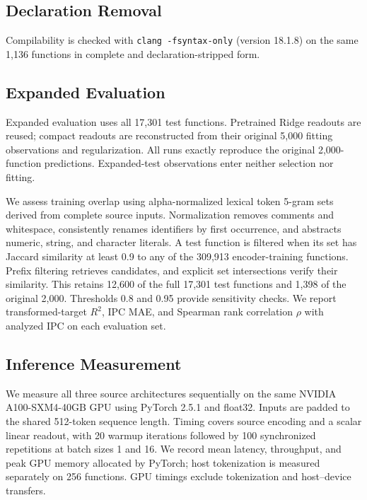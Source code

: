 \documentclass[conference]{IEEEtran}
\newenvironment{newtext}{\begingroup}{\endgroup}
\newcommand{\Rsq}{R^{2}}
\begin{document}
\begin{newtext}
\subsection{Declaration Removal}
\label{sec:protocol}
Compilability is checked with \texttt{clang -fsyntax-only} (version 18.1.8) on the same 1,136 functions in complete and declaration-stripped form.
\end{newtext}

\subsection{Expanded Evaluation}
\label{sec:expanded-setup}
Expanded evaluation uses all 17,301 test functions. Pretrained Ridge readouts are reused; compact readouts are reconstructed from their original 5,000 fitting observations and regularization. All runs exactly reproduce the original 2,000-function predictions. Expanded-test observations enter neither selection nor fitting.

We assess training overlap using alpha-normalized lexical token 5-gram sets derived from complete source inputs. Normalization removes comments and whitespace, consistently renames identifiers by first occurrence, and abstracts numeric, string, and character literals. A test function is filtered when its set has Jaccard similarity at least 0.9 to any of the 309,913 encoder-training functions. Prefix filtering retrieves candidates, and explicit set intersections verify their similarity. This retains 12,600 of the full 17,301 test functions and 1,398 of the original 2,000. Thresholds 0.8 and 0.95 provide sensitivity checks. We report transformed-target $\Rsq$, IPC MAE, and Spearman rank correlation $\rho$ with analyzed IPC on each evaluation set.

\subsection{Inference Measurement}
\label{sec:inference-setup}
We measure all three source architectures sequentially on the same NVIDIA A100-SXM4-40GB GPU using PyTorch 2.5.1 and float32. Inputs are padded to the shared 512-token sequence length. Timing covers source encoding and a scalar linear readout, with 20 warmup iterations followed by 100 synchronized repetitions at batch sizes 1 and 16. We record mean latency, throughput, and peak GPU memory allocated by PyTorch; host tokenization is measured separately on 256 functions. GPU timings exclude tokenization and host--device transfers.
\end{document}
